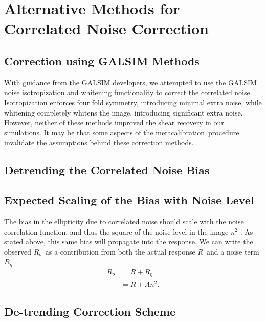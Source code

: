\documentclass[a4paper,fleqn,usenatbib]{mnras}
\newcommand{\mcal}{metacalibration}
\newcommand{\mcalR}{$R$}
\newcommand{\mcalRo}{$R_o$}
\newcommand{\mcalRnoise}{$R_\eta$}
\begin{document}
\appendix

\section{Alternative Methods for Correlated Noise Correction} \label{sec:altcorr}

\subsection{Correction using GALSIM Methods}

With guidance from the GALSIM developers, we attempted to use the GALSIM noise
isotropization and whitening functionality to correct the correlated noise.
Isotropization enforces four fold symmetry, introducing minimal extra noise,
while whitening completely whitens the image, introducing significant extra
noise.  However, neither of these methods improved the shear recovery in our
simulations.  It may be that some aspects of the \mcal\ procedure invalidate
the assumptions behind these correction methods.


\subsection{Detrending the Correlated Noise Bias} \label{sec:detrend}

\subsection{Expected Scaling of the Bias with Noise Level} \label{sec:scaling}

The bias in the ellipticity due to correlated noise should scale
with the noise correlation function, and thus the square of the noise level in
the image $n^2$ \citep{Kaiser2000,HirataCorrNoise}.  As stated above, this same bias will
propagate into the response.  We can write the observed \mcalRo\ as a contribution
from both the actual response \mcalR\ and a noise term \mcalRnoise\
\begin{align} \label{eq:scaling}
    \mbox{\mcalRo} &= R + \mbox{\mcalRnoise}  \nonumber \\
                   &= R + A n^2.
\end{align}

\subsection{De-trending Correction Scheme}
\end{document}
